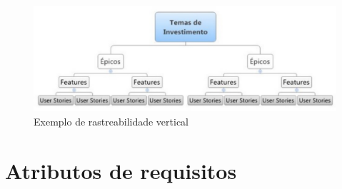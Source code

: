 \begin{figure}[!htpb]
\centering
\includegraphics[scale=0.4]{figuras/gerenciamento/vertical}
\caption{Exemplo de rastreabilidade vertical}
\end{figure}

\newpage
\section{Atributos de requisitos}

